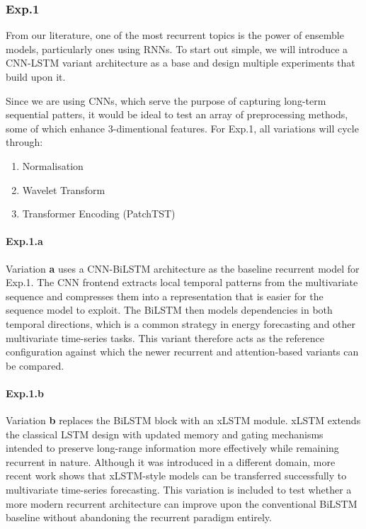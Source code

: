 \subsubsection{Exp.1}

From our literature, one of the most recurrent topics is the power of ensemble models, particularly ones using RNNs. To start out simple, we will introduce a CNN-LSTM variant architecture as a base and design multiple
experiments that build upon it.

Since we are using CNNs, which serve the purpose of capturing long-term sequential patters, it would be ideal to test an array of preprocessing methods, some of which enhance 3-dimentional features.
For Exp.1, all variations will cycle through:
\begin{enumerate}
    \item Normalisation
    \item Wavelet Transform\cite{4494757,Hiruta2025}
    \item Transformer Encoding (PatchTST\cite{PatchTST})
\end{enumerate}

\paragraph{Exp.1.a}
Variation \textbf{a} uses a CNN-BiLSTM architecture as the baseline recurrent model for Exp.1. The CNN frontend extracts local temporal patterns from the multivariate sequence and compresses them into a representation that is easier for the sequence model to exploit. The BiLSTM then models dependencies in both temporal directions, which is a common strategy in energy forecasting and other multivariate time-series tasks\cite{Shao2021,Fang2023}. This variant therefore acts as the reference configuration against which the newer recurrent and attention-based variants can be compared.

\paragraph{Exp.1.b}
Variation \textbf{b} replaces the BiLSTM block with an xLSTM module. xLSTM extends the classical LSTM design with updated memory and gating mechanisms intended to preserve long-range information more effectively while remaining recurrent in nature\cite{xLSTM2024}. Although it was introduced in a different domain, more recent work shows that xLSTM-style models can be transferred successfully to multivariate time-series forecasting\cite{xLSTMTimeSeries2025,xLSTMMixer}. This variation is included to test whether a more modern recurrent architecture can improve upon the conventional BiLSTM baseline without abandoning the recurrent paradigm entirely.

